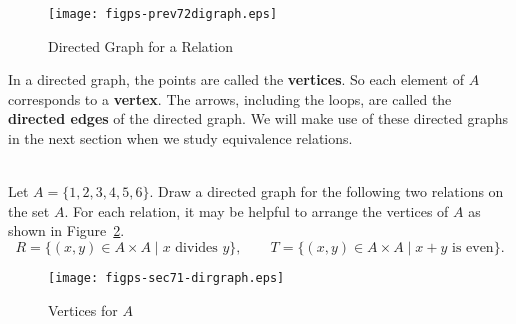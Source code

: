\begin{figure}[h]
\begin{center}
\texttt{[image: figps-prev72digraph.eps]}
\caption{Directed Graph for a Relation} \label{fig:dirgraph2}
\end{center}
\end{figure}

In a directed graph, the points are called the \textbf{vertices}.  So each element of  $A$  corresponds to a \textbf{vertex}.
%
%
  The arrows, including the loops, are called the \textbf{directed edges}
%
%
 of the directed graph.  We will make use of these directed graphs in the next section when we study equivalence relations.

\begin{prog}\label{prog:directedgraph} \hfill \\
Let $A = \{ 1, 2, 3, 4, 5, 6 \}$.  Draw a directed graph for the following two relations on the set $A$.  For each relation, it may be helpful to arrange the vertices of $A$ as shown in Figure~\ref{fig:dirgraph3}.
\[
R = \{ (x, y) \in A \times A \mid x \text{ divides } y \}, \qquad 
T = \{ (x, y) \in A \times A \mid x + y \text{ is even} \}.
\]
\begin{figure}[h]
\begin{center}
\texttt{[image: figps-sec71-dirgraph.eps]}
\caption{Vertices for $A$} \label{fig:dirgraph3}
\end{center}
\end{figure}
\end{prog}
\hbreak

\endinput


